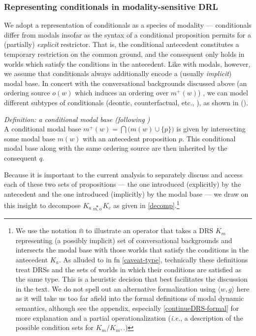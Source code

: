 \subsubsection{Representing conditionals in modality-sensitive DRL}
\label{sec:red-light-analysis}

We adopt a representation of conditionals as a species of modality --- conditionals differ from modals insofar as the syntax of a conditional proposition permits for a (partially) \textit{explicit} restrictor. That is, the conditional antecedent constitutes a temporary restriction on the common ground, and the consequent only holds in worlds which satisfy the conditions in the antecedent. Like with modals, however, we assume that conditionals always additionally encode a (usually \textit{implicit}) modal base. In concert with the conversational backgrounds discussed above (an ordering source $ o(w) $ which induces an ordering over $ m^+(w) $) \citep{Lewis1975}, we can model different subtypes of conditionals (deontic, counterfactual, etc., \citealp[see][39, 66\textit{ff}]{Kratzer2012}), as shown in (\nextx). 

\pex  \textit{Definition: a conditional modal base (following \citealt[65, 94]{Kratzer2012})} \label{cond.modality}\\
A conditional modal base $ m^+(w) =\bigcap\big(m(w)\cup \{p\}\big)$ is given by intersecting some modal base $ m(w) $ with an antecedent proposition $ p $. This conditional modal base along with the same ordering source are then inherited by the consequent $q$. \xe

Because it is important to the current analysis to separately discuss and access each of these two sets of propositions --- the one introduced (explicitly) by the antecedent and the one introduced (implicitly) by the modal base --- we draw on this insight to decompose $K_a\,\underset{m,o}{\square}\,K_c$ as given in \ref{decomp}.\footnote{We use the notation $ \Cap $ to illustrate an operator that takes a DRS $ K_m $ representing (a possibly implicit) set of conversational backgrounds and intersects the modal base with those worlds that satisfy the conditions in the antecedent $ K_a $. As alluded to in fn \ref{caveat-type}, technically these definitions treat DRSs and the sets of worlds in which their conditions are satisfied as the same type. This is a heuristic decision that best facilitates the discussion in the text. We do not spell out an alternative formalization using $ \langle w,g\rangle $ here as it will take us too far afield into the formal definitions of modal dynamic semantics, although see the appendix, especially \ref{continueDRS-formal} for more explanation and a partial operationalization (\textit{i.e.}, a description of the possible condition sets for $ K_m/K_{m^+} $.)}

